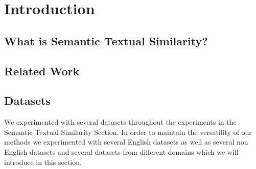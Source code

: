 \chapter{\label{cha:sts_introduction}Introduction}


\section{What is Semantic Textual Similarity?}

\section{Related Work}

\section{Datasets}
We experimented with several datasets throughout the experiments in the Semantic Textual Similarity Section. In order to maintain the versatility of our methods we experimented with several English datasets as well as several non English datasets and several datasets from different domains which we will introduce in this section.

